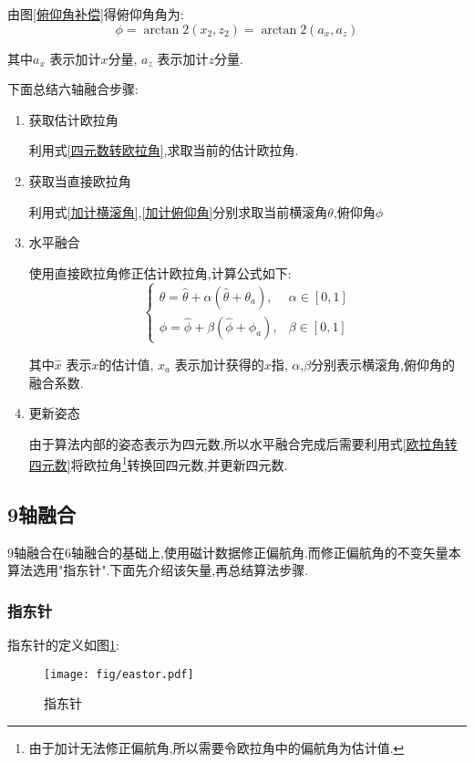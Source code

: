 由图\ref{俯仰角补偿}得俯仰角角为:
\begin{equation}\label{加计俯仰角}
    \phi = \arctan2(x_2,z_2) = \arctan2(a_x,a_z)
\end{equation} 

其中$a_x$   表示加计$x$分量,
$a_z$       表示加计$z$分量.

下面总结六轴融合步骤:
\begin{enumerate}
    \item 获取估计欧拉角

        利用式\ref{四元数转欧拉角},求取当前的估计欧拉角.
    \item 获取当直接欧拉角

        利用式\ref{加计横滚角},\ref{加计俯仰角}分别求取当前横滚角$\theta$,俯仰角$\phi$
    \item 水平融合

        使用直接欧拉角修正估计欧拉角,计算公式如下:
        \begin{equation}\label{水平融合}
            \left\{\!\!\!\begin{array}{ll}
                    \theta = \hat{\theta} + \alpha(\hat{\theta}+\theta_a), & \alpha \in [0, 1] \\
                    \phi   = \hat{\phi} + \beta(\hat{\phi}+\phi_a), & \beta \in [0, 1]
                \end{array}\right.
            \end{equation} 
            
            其中$\hat{x}$   表示$x$的估计值, 
            $x_a$           表示加计获得的$x$指,
            $\alpha$,$\beta$分别表示横滚角,俯仰角的融合系数.
    \item 更新姿态

        由于算法内部的姿态表示为四元数,所以水平融合完成后需要利用式\ref{欧拉角转四元数}将欧拉角\footnote{由于加计无法修正偏航角,所以需要令欧拉角中的偏航角为估计值.}转换回四元数,并更新四元数.
\end{enumerate}

\subsection{9轴融合}
9轴融合在6轴融合的基础上,使用磁计数据修正偏航角.而修正偏航角的不变矢量本算法选用"指东针".下面先介绍该矢量,再总结算法步骤.
\subsubsection{指东针}
指东针的定义如图\ref{指东针}:
\begin{figure}
\begin{center}
    \texttt{[image: fig/eastor.pdf]}
    \caption{指东针}\label{指东针}
\end{center}
\end{figure}

